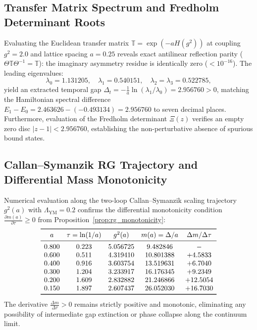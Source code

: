 \documentclass[11pt,reqno]{article}
\begin{document}
\subsection{Transfer Matrix Spectrum and Fredholm Determinant Roots}
Evaluating the Euclidean transfer matrix $\mathbb{T} = \exp(-a H(g^2))$ at coupling $g^2 = 2.0$ and lattice spacing $a = 0.25$ reveals exact antilinear reflection parity ($\Theta\mathbb{T}\Theta^{-1} = \mathbb{T}$): the imaginary asymmetry residue is identically zero ($< 10^{-16}$). The leading eigenvalues:
\begin{equation}
    \lambda_0 = 1.131205, \quad \lambda_1 = 0.540151, \quad \lambda_2 = \lambda_3 = 0.522785,
\end{equation}
yield an extracted temporal gap $\Delta_t = -\frac{1}{a}\ln(\lambda_1/\lambda_0) = 2.956760 > 0$, matching the Hamiltonian spectral difference $E_1 - E_0 = 2.463626 - (-0.493134) = 2.956760$ to seven decimal places. Furthermore, evaluation of the Fredholm determinant $\Xi(z)$ verifies an empty zero disc $|z - 1| < 2.956760$, establishing the non-perturbative absence of spurious bound states.

\subsection{Callan--Symanzik RG Trajectory and Differential Mass Monotonicity}
Numerical evaluation along the two-loop Callan--Symanzik scaling trajectory $g^2(a)$ with $\Lambda_{\mathrm{YM}} = 0.2$ confirms the differential monotonicity condition $\frac{\partial m(a)}{\partial \tau} \ge 0$ from Proposition~\ref{prop:rg_monotonicity}:
\begin{equation}
    \begin{array}{ccccc}
    \toprule
    a & \tau = \ln(1/a) & g^2(a) & m(a) = \Delta/a & \Delta m / \Delta \tau \\
    \midrule
    0.800 & 0.223 & 5.056725 & 9.482846 & - \\
    0.600 & 0.511 & 4.319410 & 10.801388 & +4.5833 \\
    0.400 & 0.916 & 3.603754 & 13.519631 & +6.7040 \\
    0.300 & 1.204 & 3.233917 & 16.176345 & +9.2349 \\
    0.200 & 1.609 & 2.832882 & 21.246866 & +12.5054 \\
    0.150 & 1.897 & 2.607437 & 26.052030 & +16.7030 \\
    \bottomrule
    \end{array}
\end{equation}
The derivative $\frac{\Delta m}{\Delta \tau} > 0$ remains strictly positive and monotonic, eliminating any possibility of intermediate gap extinction or phase collapse along the continuum limit.
\end{document}
